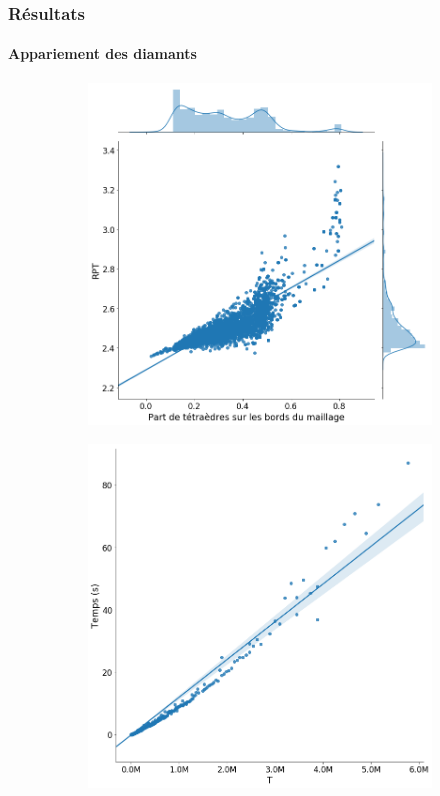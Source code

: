 \documentclass[9pt]{beamer}
\begin{document}
\begin{frame}
\small
\frametitle{Résultats}
\framesubtitle{Appariement des diamants}
\small
\begin{figure}[H]
\centering
\begin{subfigure}{.5\textwidth}
  \centering
  \includegraphics[scale=0.18]{../Images/boundary_RPT}
  \caption{}
\end{subfigure}%
\begin{subfigure}{.5\textwidth}
  \centering
  \includegraphics[scale=0.18]{../Images/T_time}

\end{subfigure}
\end{figure}
\end{frame}
\end{document}
